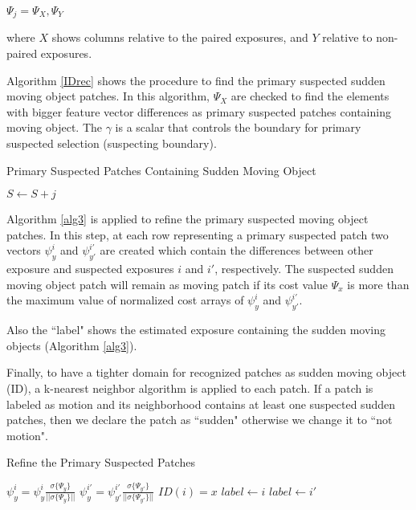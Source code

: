 \documentclass[preprint,12pt,3p]{elsarticle}
\begin{document}
\begin{center}
	$ \Psi_j={\Psi_X, \Psi_Y}$
\end{center}

\noindent where $X$ shows columns relative to the paired exposures, and $Y$ relative to non-paired exposures.

Algorithm \ref{IDrec} shows the procedure to find the primary suspected sudden moving object patches. In this algorithm, $\Psi_X$ are checked to find the elements with bigger feature vector differences as primary suspected patches containing moving object. The $\gamma$ is a scalar that controls the boundary for primary suspected selection (suspecting boundary).  

\begin{algorithm}[h]
\caption{ Primary Suspected Patches Containing Sudden Moving Object}
\label{IDrec} %
\begin{algorithmic}
\State $ S \gets S + j $
\EndIf
\EndFor
\EndFor
\end{algorithmic}
\end{algorithm}

Algorithm \ref{alg3} is applied to refine the primary suspected moving object patches. In this step, at each row representing a primary suspected patch two vectors $\psi_{y}^{i}$ and $\psi_{y'}^{i'}$ are created which contain the differences between other exposure and suspected exposures $i$ and $i'$, respectively. 
The suspected sudden moving object patch will remain as moving patch if its cost value $\Psi_{x}$ is more than the maximum value of normalized cost arrays of $\psi_{y}^{i}$ and $\psi_{y'}^{i'}$. 

Also the ``label" shows the estimated exposure containing the sudden moving objects (Algorithm \ref{alg3}).

Finally, to have a tighter domain for recognized patches as sudden moving object (ID), a k-nearest neighbor algorithm is applied to each patch. If a patch is labeled as motion and its neighborhood contains at least one suspected sudden patches, then we declare the patch as ``sudden" otherwise we change it to ``not motion".

\begin{algorithm}[H]
\caption{Refine the Primary Suspected Patches}
\label{alg3}
\begin{algorithmic}

\State $ \psi_{y}^{i}= \psi_{y}^{i} \frac{\sigma\{\Psi_{y}\}}{|| \sigma\{\Psi_{y}\}||}$
\State $\psi_{y}^{i'}= \psi_{y'}^{i'} \frac{\sigma\{\Psi_{y'}\}}{|| \sigma\{\Psi_{y'}\}||}$
\State $ ID(i) = x$
\State $ label \gets i $
\Else 
\State $ label \gets i'$
\EndIf
\EndIf
\EndFor
\end{algorithmic}
\end{algorithm}
\end{document}
